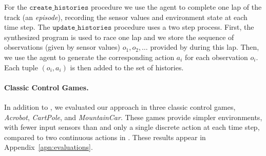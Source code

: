 For the $\mathtt{create\_histories}$ procedure we use the \drl agent to complete one lap of the track (an {\em episode}), recording the sensor values and environment state at each time step. The $\mathtt{update\_histories}$ procedure uses a two step process. First, the synthesized program is used to race one lap and we store the sequence of observations (given by sensor values) $o_1,o_2,\dots$ provided by \torcs during this lap. Then, we use the \drl agent to generate the corresponding action $a_i$ for each observation $o_i$. Each tuple $(o_i, a_i)$ is then added to the set of histories.

\paragraph{Classic Control Games.} 
In addition to \torcs, we evaluated our approach in three classic control games, \emph{Acrobot}, {\em CartPole}, and {\em MountainCar}. These games provide simpler \rl environments, with fewer input sensors than \torcs and only a single discrete action at each time step, compared to two continuous actions in \torcs. These results appear in Appendix~\ref{apn:evaluations}.
